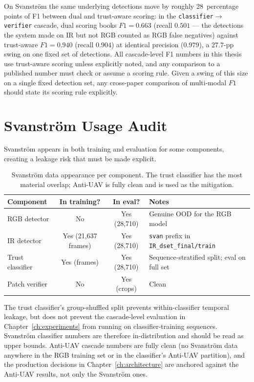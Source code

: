 \documentclass[12pt,a4paper,oneside,openright]{book}
\begin{document}
On Svanstr\"om the same underlying detections move by roughly 28~percentage points of F1 between dual and trust-aware scoring: in the \texttt{classifier$\to$verifier} cascade, dual scoring books $F1=0.663$ (recall $0.501$ --- the detections the system made on IR but not RGB counted as RGB false negatives) against trust-aware $F1=0.940$ (recall $0.904$) at identical precision ($0.979$), a $27.7$-pp swing on one fixed set of detections. All cascade-level F1 numbers in this thesis use trust-aware scoring unless explicitly noted, and any comparison to a published number must check or assume a scoring rule. Given a swing of this size on a single fixed detection set, any cross-paper comparison of multi-modal $F1$ should state its scoring rule explicitly.

\section{Svanstr\"om Usage Audit}
\label{sec:svanstrom_audit}

Svanstr\"om appears in both training and evaluation for some components, creating a leakage risk that must be made explicit.

\begin{table}[htbp]
    \centering
    \caption{Svanstr\"om data appearance per component. The trust classifier has the most material overlap; Anti-UAV is fully clean and is used as the mitigation.}
    \label{tab:svanstrom_audit}
    \begin{tabular}{lccl}
        \toprule
        Component & In training? & In eval? & Notes \\
        \midrule
        RGB detector  & No  & Yes (28,710) & Genuine OOD for the RGB model \\
        IR detector   & Yes (21{,}637 frames) & Yes (28,710) & \texttt{svan} prefix in \texttt{IR\_dset\_final/train} \\
        Trust classifier & Yes (frames) & Yes (28,710) & Sequence-stratified split; eval on full set \\
        Patch verifier & No & Yes (crops) & Clean \\
        \bottomrule
    \end{tabular}
\end{table}

The trust classifier's group-shuffled split prevents within-classifier temporal leakage, but does not prevent the cascade-level evaluation in Chapter~\ref{ch:experiments} from running on classifier-training sequences. Svanstr\"om classifier numbers are therefore in-distribution and should be read as upper bounds. Anti-UAV cascade numbers are fully clean (no Svanstr\"om data anywhere in the RGB training set or in the classifier's Anti-UAV partition), and the production decisions in Chapter~\ref{ch:architecture} are anchored against the Anti-UAV results, not only the Svanstr\"om ones.
\end{document}
